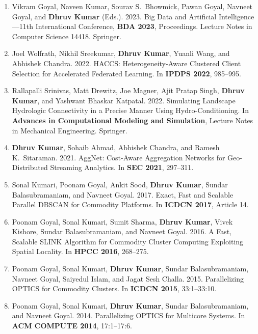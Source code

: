 \documentclass[10pt, a4paper]{article}
\begin{document}
\begin{enumerate}[label=\textbf{C\arabic*.}, leftmargin=2.8em, itemsep=0.3em]
\item Vikram Goyal, Naveen Kumar, Sourav S.\ Bhowmick, Pawan Goyal, Navneet Goyal, and \textbf{Dhruv Kumar} (Eds.). 2023. Big Data and Artificial Intelligence---11th International Conference, \textbf{BDA 2023}, Proceedings. Lecture Notes in Computer Science 14418. Springer.

\item Joel Wolfrath, Nikhil Sreekumar, \textbf{Dhruv Kumar}, Yuanli Wang, and Abhishek Chandra. 2022. HACCS: Heterogeneity-Aware Clustered Client Selection for Accelerated Federated Learning. In \textbf{IPDPS 2022}, 985--995.

\item Rallapalli Srinivas, Matt Drewitz, Joe Magner, Ajit Pratap Singh, \textbf{Dhruv Kumar}, and Yashwant Bhaskar Katpatal. 2022. Simulating Landscape Hydrologic Connectivity in a Precise Manner Using Hydro-Conditioning. In \textbf{Advances in Computational Modeling and Simulation}, Lecture Notes in Mechanical Engineering. Springer.

\item \textbf{Dhruv Kumar}, Sohaib Ahmad, Abhishek Chandra, and Ramesh K.\ Sitaraman. 2021. AggNet: Cost-Aware Aggregation Networks for Geo-Distributed Streaming Analytics. In \textbf{SEC 2021}, 297--311.

\item Sonal Kumari, Poonam Goyal, Ankit Sood, \textbf{Dhruv Kumar}, Sundar Balasubramaniam, and Navneet Goyal. 2017. Exact, Fast and Scalable Parallel DBSCAN for Commodity Platforms. In \textbf{ICDCN 2017}, Article 14.

\item Poonam Goyal, Sonal Kumari, Sumit Sharma, \textbf{Dhruv Kumar}, Vivek Kishore, Sundar Balasubramaniam, and Navneet Goyal. 2016. A Fast, Scalable SLINK Algorithm for Commodity Cluster Computing Exploiting Spatial Locality. In \textbf{HPCC 2016}, 268--275.

\item Poonam Goyal, Sonal Kumari, \textbf{Dhruv Kumar}, Sundar Balasubramaniam, Navneet Goyal, Saiyedul Islam, and Jagat Sesh Challa. 2015. Parallelizing OPTICS for Commodity Clusters. In \textbf{ICDCN 2015}, 33:1--33:10.

\item Poonam Goyal, Sonal Kumari, \textbf{Dhruv Kumar}, Sundar Balasubramaniam, and Navneet Goyal. 2014. Parallelizing OPTICS for Multicore Systems. In \textbf{ACM COMPUTE 2014}, 17:1--17:6.

\end{enumerate}
\end{document}
